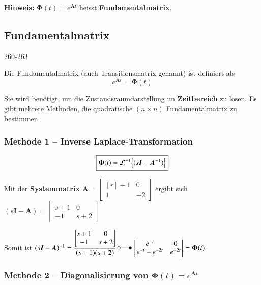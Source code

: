 \textbf{Hinweis:} $\bm{\Phi}(t) = e^{\bm{A} t}$ heisst \textbf{Fundamentalmatrix}. 


\subsection{Fundamentalmatrix}{260-263}

Die Fundamentalmatrix (auch Transitionsmatrix genannt) ist definiert als
$$ \boxed{  e^{\bm{A} t} = \bm{\Phi}(t) } $$

Sie wird benötigt, um die Zustandsraumdarstellung im \textbf{Zeitbereich} zu lösen.
Es gibt mehrere Methoden, die quadratische $(n \times n)$ Fundamentalmatrix zu bestimmen.


\subsubsection{Methode 1 -- Inverse Laplace-Transformation}

$$ \boxed{ \bm{\Phi}(t) = \mathcal{L}^{-1} \Bigl\{ (s \bm{I} - \bm{A}^{-1})  \Bigr\} } $$



Mit der \textbf{Systemmatrix} $\bm{A} = \begin{bmatrix*}[r] -1 & 0 \\ 1 & -2 \end{bmatrix*}$ ergibt sich 
$(s \bm{I} - \bm{A}) = \begin{bmatrix*} s+1 & 0 \\ -1 & s+2 \end{bmatrix*}$

Somit ist $(s \bm{I} - \bm{A})^{-1} = \dfrac{\begin{bmatrix*} s+1 & 0 \\ -1 & s+2 \end{bmatrix*}}{(s+1)(s+2)} \,
\laplace \, \begin{bmatrix*} e^{-t} & 0 \\ e^{-t} - e^{-2t} & e^{-2t} \end{bmatrix*} = \bm{\Phi}(t)$


\subsubsection{Methode 2 -- Diagonalisierung von $\bm{\Phi}(t) = e^{\bm{A} t}$}

